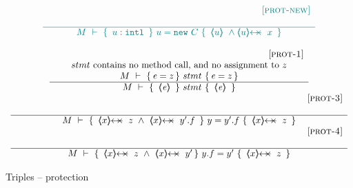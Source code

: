 \begin{figure}[tht]
$
\begin{array}{c}
 \sdN{\inferruleSD{\hspace{2.3cm} [\sc{prot-new}]}
	{	}
	{	 
 	\hproves{M} 
 						{\  \internal {u}   \ }
 					{\  u = \prg{new}\ C \ }
 						  { \  \inside{u}\  \wedge  \protectedFrom{u}{x} \ } 
 	}
}
\\
\\
	{{\inferruleSD{\hspace{2.3cm} [\sc{prot-1}]}
	{   stmt \ \mbox{contains no method call, and no assignment to $z$}
	\\
	{\hproves{M}  {\re = z} {\ stmt\ }{ \re=z} }
	}
	{\hproves{M} 
						{\  \inside{\re}  \ }
						{\  stmt \ }
						{\  \inside{\re}\ }
	}
}}
\\
      {\inferruleSD{\hspace{5.3cm} [\sc{prot-3}]}
	{ }
	{\hproves{M} 
						{\ \protectedFrom{x}{z}\ \wedge\ \protectedFrom{x}{y'.f} \ }
						{\ y =y'.f\ }
						{\ \protectedFrom{x}{z}\ }
	}
}
%
\\
        {\inferruleSD{\hspace{5.3cm} [\sc{prot-4}]}
	{ }
	{\hproves{M} 
						{\ \protectedFrom{x}{z} \ \wedge \   \protectedFrom{x}{y'} }
						{\ y.f=y'\ }
						{\ \protectedFrom{x}{z} \ }
	}
}	 
\end{array}
 $
\caption{Triples -- protection}
\label{f:protection}
\end{figure}








